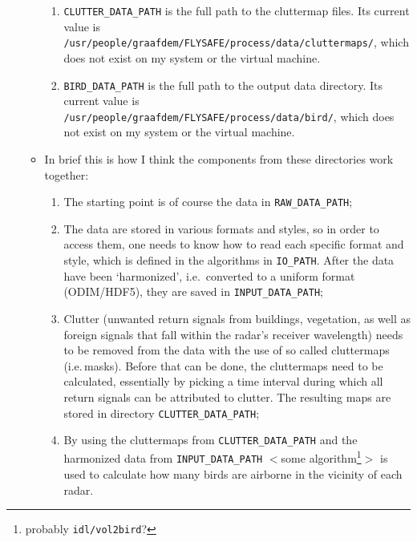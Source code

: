 \begin{enumerate}
\begin{itemize}
\begin{enumerate}
\item{\texttt{CLUTTER\_DATA\_PATH} is the full path to the cluttermap files. Its current value is \texttt{/usr/people/graafdem/FLYSAFE/process/data/cluttermaps/}, which does not exist on my system or the virtual machine.}
\item{\texttt{BIRD\_DATA\_PATH} is the full path to the output data directory. Its current value is \texttt{/usr/people/graafdem/FLYSAFE/process/data/bird/}, which does not exist on my system or the virtual machine.}
\end{enumerate}
\item[]{In brief this is how I think the components from these directories work together:}
\begin{enumerate}
\item{The starting point is of course the data in \texttt{RAW\_DATA\_PATH};}
\item{The data are stored in various formats and styles, so in order to access them, one needs to know how to read each specific format and style, which is defined in the algorithms in \texttt{IO\_PATH}. After the data have been `harmonized', i.e.\, converted to a uniform format (ODIM/HDF5), they are saved in \texttt{INPUT\_DATA\_PATH};}
\item{Clutter (unwanted return signals from buildings, vegetation, as well as foreign signals that fall within the radar's receiver wavelength) needs to be removed from the data with the use of so called cluttermaps (i.e.\,masks). Before that can be done, the cluttermaps need to be calculated, essentially by picking a time interval during which all return signals can be attributed to clutter. The resulting maps are stored in directory \texttt{CLUTTER\_DATA\_PATH};}
\item{By using the cluttermaps from \texttt{CLUTTER\_DATA\_PATH} and the harmonized data from \texttt{INPUT\_DATA\_PATH} $<$some algorithm\footnote{probably \texttt{idl/vol2bird}?}$>$ is used to calculate how many birds are airborne in the vicinity of each radar.}
\end{enumerate}


\end{itemize}
\end{enumerate}
